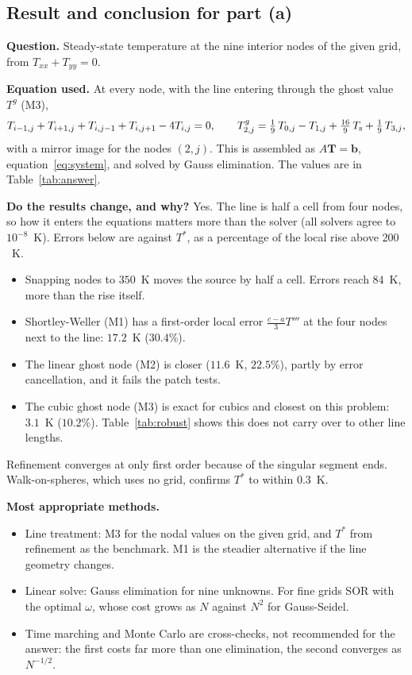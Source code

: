 \subsection{Result and conclusion for part (a)}\label{sec:result}

\textbf{Question.} Steady-state temperature at the nine interior nodes of the given grid, from $T_{xx}+T_{yy}=0$.

\textbf{Equation used.} At every node, with the line entering through the ghost value $T^g$ (M3),
\begin{equation}
  T_{i-1,j}+T_{i+1,j}+T_{i,j-1}+T_{i,j+1}-4T_{i,j}=0,\qquad
  T^g_{2,j}=\tfrac19\,T_{0,j}-T_{1,j}+\tfrac{16}{9}\,T_{\mathrm{s}}+\tfrac19\,T_{3,j} ,
\end{equation}
with a mirror image for the nodes $(2,j)$. This is assembled as $A\mathbf T=\mathbf b$, equation~\eqref{eq:system}, and solved
by Gauss elimination. The values are in Table~\ref{tab:answer}.

\textbf{Do the results change, and why?} Yes. The line is half a cell from four nodes, so how it enters the equations matters
more than the solver (all solvers agree to $10^{-8}$~K). Errors below are against $T^*$, as a percentage of the local rise
above $200$~K.
\begin{itemize}
  \item Snapping nodes to $350$~K moves the source by half a cell. Errors reach $84$~K, more than the rise itself.
  \item Shortley-Weller (M1) has a first-order local error $\tfrac{c-a}{3}T'''$ at the four nodes next to the line:
        $17.2$~K ($30.4\%$).
  \item The linear ghost node (M2) is closer ($11.6$~K, $22.5\%$), partly by error cancellation, and it fails the patch tests.
  \item The cubic ghost node (M3) is exact for cubics and closest on this problem: $3.1$~K ($10.2\%$). Table~\ref{tab:robust}
        shows this does not carry over to other line lengths.
\end{itemize}
Refinement converges at only first order because of the singular segment ends. Walk-on-spheres, which uses no grid, confirms
$T^*$ to within $0.3$~K.

\textbf{Most appropriate methods.}
\begin{itemize}
  \item Line treatment: M3 for the nodal values on the given grid, and $T^*$ from refinement as the benchmark.
        M1 is the steadier alternative if the line geometry changes.
  \item Linear solve: Gauss elimination for nine unknowns. For fine grids SOR with the optimal $\omega$, whose cost grows as $N$
        against $N^2$ for Gauss-Seidel.
  \item Time marching and Monte Carlo are cross-checks, not recommended for the answer: the first costs far more than one
        elimination, the second converges as $N^{-1/2}$.
\end{itemize}

